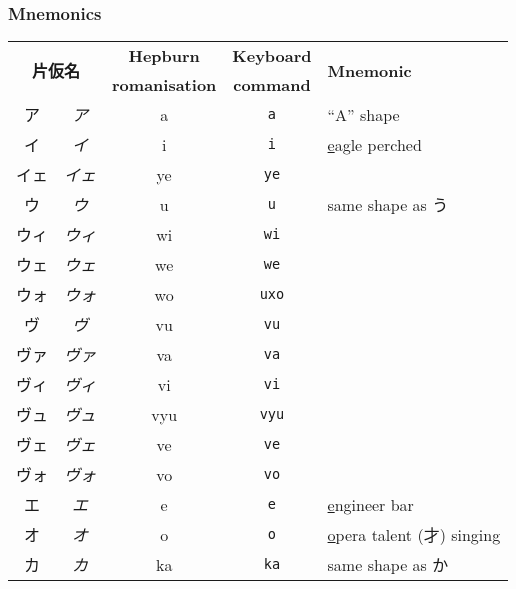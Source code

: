 \documentclass[../nihongo-gakushuu-kyouzai.tex]{subfiles}
\begin{document}
\subsubsection{Mnemonics}
\begin{longtable}[c]{@{}ccccl@{}}
    \toprule
    \multicolumn{2}{c}{\multirow{2}{*}{\textbf{片仮名}}} & \textbf{Hepburn} & \textbf{Keyboard} & \multirow{2}{*}{\textbf{Mnemonic}} \\
    \multicolumn{2}{c}{} & \textbf{romanisation} & \textbf{command} & \\* \midrule
    ア & \emph{ア} & a & \texttt{a} & ``A'' shape \\
    イ & \emph{イ} & i & \texttt{i} & \ul{e}agle perched \\
    \color{blue} イェ & \color{blue} \emph{イェ} & \color{blue} ye & \color{blue} \texttt{ye} & \\
    ウ & \emph{ウ} & u & \texttt{u} & same shape as う \\
    \color{blue} ウィ & \color{blue} \emph{ウィ} & \color{blue} wi & \color{blue} \texttt{wi} & \\
    \color{blue} ウェ & \color{blue} \emph{ウェ} & \color{blue} we & \color{blue} \texttt{we} & \\
    \color{blue} ウォ & \color{blue} \emph{ウォ} & \color{blue} wo & \color{red} \texttt{uxo} & \\
    \color{blue} ヴ & \color{blue} \emph{ヴ} & \color{blue} vu & \color{blue} \texttt{vu} & \\
    \color{blue} ヴァ & \color{blue} \emph{ヴァ} & \color{blue} va & \color{blue} \texttt{va} & \\
    \color{blue} ヴィ & \color{blue} \emph{ヴィ} & \color{blue} vi & \color{blue} \texttt{vi} & \\
    \color{blue} ヴュ & \color{blue} \emph{ヴュ} & \color{blue} vyu & \color{blue} \texttt{vyu} & \\
    \color{blue} ヴェ & \color{blue} \emph{ヴェ} & \color{blue} ve & \color{blue} \texttt{ve} & \\
    \color{blue} ヴォ & \color{blue} \emph{ヴォ} & \color{blue} vo & \color{blue} \texttt{vo} & \\
    エ & \emph{エ} & e & \texttt{e} & \ul{e}ngineer bar \\
    オ & \emph{オ} & o & \texttt{o} & \ul{o}pera talent (才) singing \\
    カ & \emph{カ} & ka & \texttt{ka} & same shape as か \\

\end{longtable}
\end{document}
